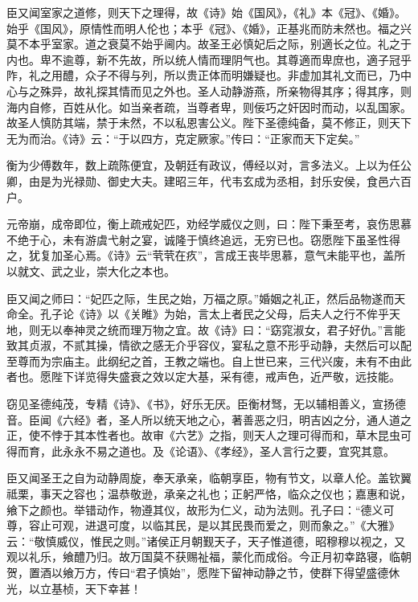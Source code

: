 \documentclass[12pt,UTF8]{ctexbook}
\begin{document}
臣又闻室家之道修，则天下之理得，故《诗》始《国风》，《礼》本《冠》、《婚》。始乎《国风》，原情性而明人伦也；本乎《冠》、《婚》，正基兆而防未然也。福之兴莫不本乎室家。道之衰莫不始乎阃内。故圣王必慎妃后之际，别適长之位。礼之于内也。卑不逾尊，新不先故，所以统人情而理阴气也。其尊適而卑庶也，適子冠乎阼，礼之用醴，众子不得与列，所以贵正体而明嫌疑也。非虚加其礼文而已，乃中心与之殊异，故礼探其情而见之外也。圣人动静游燕，所亲物得其序；得其序，则海内自修，百姓从化。如当亲者疏，当尊者卑，则佞巧之奸因时而动，以乱国家。故圣人慎防其端，禁于未然，不以私恩害公义。陛下圣德纯备，莫不修正，则天下无为而治。《诗》云：“于以四方，克定厥家。”传曰：“正家而天下定矣。”



衡为少傅数年，数上疏陈便宜，及朝廷有政议，傅经以对，言多法义。上以为任公卿，由是为光禄勋、御史大夫。建昭三年，代韦玄成为丞相，封乐安侯，食邑六百户。



元帝崩，成帝即位，衡上疏戒妃匹，劝经学威仪之则，曰：陛下秉至考，哀伤思慕不绝于心，未有游虞弋射之宴，诚隆于慎终追远，无穷已也。窃愿陛下虽圣性得之，犹复加圣心焉。《诗》云“茕茕在疚”，言成王丧毕思慕，意气未能平也，盖所以就文、武之业，崇大化之本也。



臣又闻之师曰：“妃匹之际，生民之始，万福之原。”婚姻之礼正，然后品物遂而天命全。孔子论《诗》以《关睢》为始，言太上者民之父母，后夫人之行不侔乎天地，则无以奉神灵之统而理万物之宜。故《诗》曰：“窈窕淑女，君子好仇。”言能致其贞淑，不贰其操，情欲之感无介乎容仪，宴私之意不形乎动静，夫然后可以配至尊而为宗庙主。此纲纪之首，王教之端也。自上世已来，三代兴废，未有不由此者也。愿陛下详览得失盛衰之效以定大基，采有德，戒声色，近严敬，远技能。



窃见圣德纯茂，专精《诗》、《书》，好乐无厌。臣衡材驽，无以辅相善义，宣扬德音。臣闻《六经》者，圣人所以统天地之心，著善恶之归，明吉凶之分，通人道之正，使不悖于其本性者也。故审《六艺》之指，则天人之理可得而和，草木昆虫可得而育，此永永不易之道也。及《论语》、《孝经》，圣人言行之要，宜究其意。



臣又闻圣王之自为动静周旋，奉天承亲，临朝享臣，物有节文，以章人伦。盖钦翼祗栗，事天之容也；温恭敬逊，承亲之礼也；正躬严恪，临众之仪也；嘉惠和说，飨下之颜也。举错动作，物遵其仪，故形为仁义，动为法则。孔子曰：“德义可尊，容止可观，进退可度，以临其民，是以其民畏而爱之，则而象之。”《大雅》云：“敬慎威仪，惟民之则。”诸侯正月朝觐天子，天子惟道德，昭穆穆以视之，又观以礼乐，飨醴乃归。故万国莫不获赐祉福，蒙化而成俗。今正月初幸路寝，临朝贺，置酒以飨万方，传曰“君子慎始”，愿陛下留神动静之节，使群下得望盛德休光，以立基桢，天下幸甚！
\end{document}
